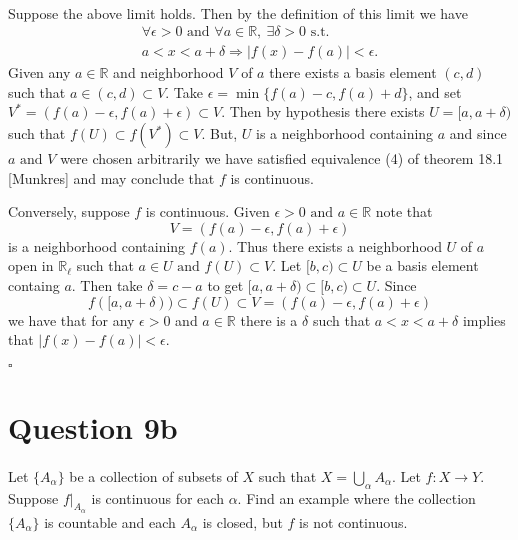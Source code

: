 \documentclass[11pt, oneside]{article}   	%
\newcommand{\R}{\mathbb{R}}
\newcommand{\tand}{\text{ and }}
\newcommand{\qed}{\begin{center}
$\square$
\end{center}}
\newcommand{\set}[1]{\{ #1 \}}
\begin{document}
\paragraph{}

Suppose the above limit holds. Then by the definition of this limit we have
\begin{eqnarray*}
\forall \epsilon > 0 \tand \forall a \in \R, \  \exists \delta>0 \text{ s.t. }\\
 a < x < a + \delta \Rightarrow | f(x) -f(a)| < \epsilon.
\end{eqnarray*}
Given any $a \in \R$ and neighborhood $V$ of $a$ there exists a basis element $(c,d)$ such that $a \in (c,d) \subset V$. Take $\epsilon = \min{\set{f(a) - c, f(a) +d}}$, and set $V^* = (f(a)-\epsilon, f(a) + \epsilon) \subset V$. Then by hypothesis there exists $U = [a,a+\delta)$ such that $f(U) \subset f(V^*) \subset V$. But, $U$ is a neighborhood containing $a$ and since $a \tand V$ were chosen arbitrarily we have satisfied equivalence (4) of theorem 18.1 [Munkres] and may conclude that $f$ is continuous.

Conversely, suppose $f$ is continuous. Given $\epsilon > 0 \tand a \in \R$ note that 
\begin{equation*}
V = (f(a)-\epsilon, f(a) + \epsilon)
\end{equation*}
is a neighborhood containing $f(a)$. Thus there exists a neighborhood $U$ of $a$ open in $\R_\ell$ such that $a \in U \tand f(U) \subset V$. Let $[b,c) \subset U$ be a basis element containg $a$. Then take $\delta = c-a$ to get $[a,a+\delta) \subset [b,c) \subset U$. Since 
\begin{equation*}
f([a,a+\delta)) \subset f(U) \subset V = (f(a)-\epsilon, f(a) + \epsilon)
\end{equation*}
we have that for any $\epsilon > 0$ and $a \in \R$ there is  a $\delta$ such that $a<x<a+\delta$ implies that $|f(x)-f(a)| < \epsilon$. \qed


\section*{Question 9b}
\paragraph{}

Let $\set{A_\alpha}$ be a collection of subsets of $X$ such that $X = \bigcup_\alpha A_\alpha$. Let $f:X \to Y$. Suppose $f \big|_{A_\alpha} $ is continuous for each $\alpha$. Find an example where the collection $\set{A_\alpha}$ is countable and each $A_\alpha$ is closed, but $f$ is not continuous.
\end{document}
